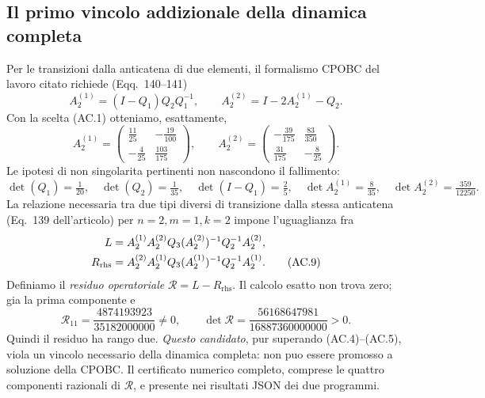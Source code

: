 \documentclass[11pt,a4paper]{article}
\begin{document}
\subsection*{Il primo vincolo addizionale della dinamica completa}
Per le transizioni dalla anticatena di due elementi, il formalismo CPOBC del lavoro citato richiede (Eqq.~140--141)
\begin{equation}
A_2^{(1)}=(I-Q_1)Q_2Q_1^{-1},\qquad
A_2^{(2)}=I-2A_2^{(1)}-Q_2.\tag{AC.6}
\end{equation}
Con la scelta (AC.1) otteniamo, esattamente,
\begin{equation}
A_2^{(1)}=\begin{pmatrix}\frac{11}{25}&-\frac{19}{100}\\-\frac4{25}&\frac{103}{175}\end{pmatrix},\qquad
A_2^{(2)}=\begin{pmatrix}-\frac{39}{175}&\frac{83}{350}\\\frac{31}{175}&-\frac8{25}\end{pmatrix}.\tag{AC.7}
\end{equation}
Le ipotesi di non singolarita pertinenti non nascondono il fallimento:
\begin{equation}
\det(Q_1)=\tfrac1{20},\quad \det(Q_2)=\tfrac1{35},\quad
\det(I-Q_1)=\tfrac25,\quad
\det A_2^{(1)}=\tfrac8{35},\quad
\det A_2^{(2)}=\tfrac{359}{12250}.\tag{AC.8}
\end{equation}
La relazione necessaria tra due tipi diversi di transizione dalla stessa anticatena (Eq.~139 dell'articolo) per $n=2,m=1,k=2$ impone l'uguaglianza fra
\begin{align}
L&=A_2^{(1)} A_2^{(2)}Q_3(A_2^{(2)})^{-1}Q_2^{-1}A_2^{(2)},\notag\\
R_{\mathrm{rhs}}&=A_2^{(2)} A_2^{(1)}Q_3(A_2^{(1)})^{-1}Q_2^{-1}A_2^{(1)}.\tag{AC.9}
\end{align}
Definiamo il \emph{residuo operatoriale} $\mathcal R=L-R_{\mathrm{rhs}}$. Il calcolo esatto non trova zero; gia la prima componente e
\begin{equation}
\mathcal R_{11}=\frac{4874193923}{35182000000}\ne0,
\qquad
\boxed{\det\mathcal R=\frac{56168647981}{16887360000000}>0.}\tag{AC.10}
\end{equation}
Quindi il residuo ha rango due. \emph{Questo candidato}, pur superando (AC.4)--(AC.5), viola un vincolo necessario della dinamica completa: non puo essere promosso a soluzione della CPOBC. Il certificato numerico completo, comprese le quattro componenti razionali di $\mathcal R$, e presente nei risultati JSON dei due programmi.
\end{document}
